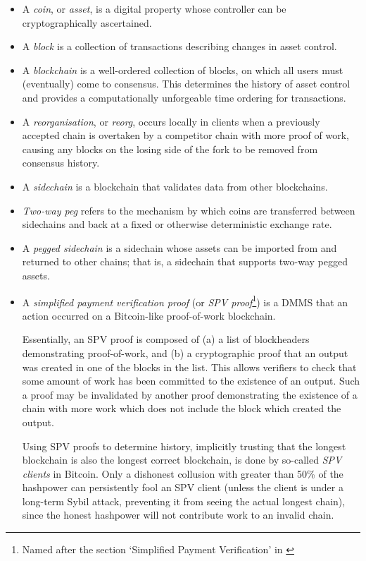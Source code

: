 \documentclass[letterpaper]{article}
\newcommand{\sidechain}{sidechain\xspace}
\newcommand{\sidechains}{sidechains\xspace}
\newcommand{\peggedsidechain}{pegged sidechain\xspace}
\newcommand{\hashsig}{DMMS\xspace}
\begin{document}
\begin{itemize}
\item A \emph{coin}, or \emph{asset}, is a digital property whose controller
can be cryptographically ascertained.

\item A \emph{block} is a collection of transactions describing changes in
asset control.

\item A \emph{blockchain} is a well-ordered collection of blocks, on which
all users must (eventually) come to consensus. This determines the history
of asset control and provides a computationally unforgeable time ordering
for transactions.

\item A \emph{reorganisation}, or \emph{reorg}, occurs locally in clients when a previously accepted chain is overtaken by a competitor chain with more proof of work, causing any blocks on the losing side of the fork to be removed from consensus history.

\item A \emph{\sidechain} is a blockchain that validates data from
other blockchains.

\item \emph{Two-way peg} refers to the mechanism by which coins are transferred
between \sidechains and back at a fixed or otherwise deterministic exchange rate.

\item A \emph{\peggedsidechain} is a \sidechain whose assets can be imported from
and returned to other chains; that is, a \sidechain that supports two-way pegged assets.

\item A \emph{simplified payment verification proof} (or \emph{SPV proof}\footnote{Named after the section `Simplified Payment Verification' in \cite{nakamoto2009}}) is
a \hashsig that an action occurred on a Bitcoin-like proof-of-work blockchain.

Essentially, an SPV proof is composed of (a) a list of blockheaders
demonstrating proof-of-work, and (b) a cryptographic proof that an
output was created in one of the blocks in the list.
This allows verifiers to check that some amount of work has been
committed to the existence of an output. Such a proof may be invalidated
by another proof demonstrating the existence of a chain with more work
which does not include the block which created the output.

Using SPV proofs to determine history, implicitly trusting that the longest
blockchain is also the longest correct blockchain, is done by so-called
\emph{SPV clients} in Bitcoin.
Only a dishonest collusion with greater than 50\% of the hashpower can persistently
fool an SPV client (unless the client is under a long-term Sybil attack, preventing it from seeing the actual longest chain), since the honest hashpower will not contribute work to an invalid chain.


\end{itemize}
\end{document}
